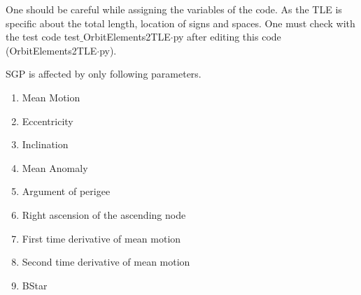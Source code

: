 \documentclass[a4paper, oneside,11pt]{article}
\begin{document}
One should be careful while assigning  the variables of the code. As the TLE is specific about the total length, location of signs and spaces. One must check with the test code test$\_$OrbitElements2TLE$\cdot$py after editing this code (OrbitElements2TLE$\cdot$py).

SGP is affected by only following parameters.
\begin{enumerate}
\item Mean Motion
\item Eccentricity
\item Inclination
\item Mean Anomaly
\item Argument of perigee
\item Right ascension of the ascending node
\item First time derivative of mean motion
\item Second time derivative of mean motion
\item BStar
\end{enumerate}
\printbibliography 
\end{document}
